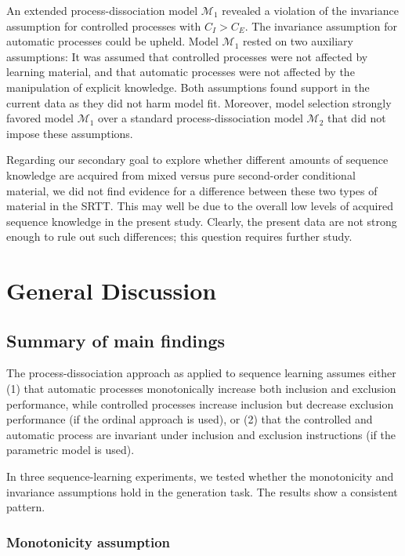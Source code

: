 \documentclass[floatsintext,doc]{apa6}
\theoremstyle{definition}
\theoremstyle{definition}
\theoremstyle{definition}
\theoremstyle{remark}
\begin{document}
An extended process-dissociation model \(\mathcal{M}_1\) revealed a
violation of the invariance assumption for controlled processes with
\(C_I > C_E\). The invariance assumption for automatic processes could
be upheld. Model \(\mathcal{M}_1\) rested on two auxiliary assumptions:
It was assumed that controlled processes were not affected by learning
material, and that automatic processes were not affected by the
manipulation of explicit knowledge. Both assumptions found support in
the current data as they did not harm model fit. Moreover, model
selection strongly favored model \(\mathcal{M}_1\) over a standard
process-dissociation model \(\mathcal{M}_2\) that did not impose these
assumptions.

Regarding our secondary goal to explore whether different amounts of
sequence knowledge are acquired from mixed versus pure second-order
conditional material, we did not find evidence for a difference between
these two types of material in the SRTT. This may well be due to the
overall low levels of acquired sequence knowledge in the present study.
Clearly, the present data are not strong enough to rule out such
differences; this question requires further study.

\section{General Discussion}\label{general-discussion}

\subsection{Summary of main findings}\label{summary-of-main-findings}

The process-dissociation approach as applied to sequence learning
assumes either (1) that automatic processes monotonically increase both
inclusion and exclusion performance, while controlled processes increase
inclusion but decrease exclusion performance (if the ordinal approach is
used), or (2) that the controlled and automatic process are invariant
under inclusion and exclusion instructions (if the parametric model is
used).

In three sequence-learning experiments, we tested whether the
monotonicity and invariance assumptions hold in the generation task. The
results show a consistent pattern.

\subsubsection{Monotonicity assumption}\label{monotonicity-assumption}
\end{document}
